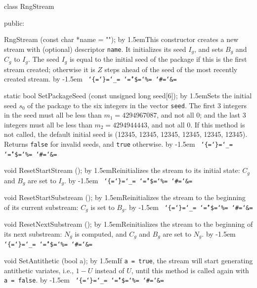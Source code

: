 \documentclass[12pt]{article}
\newif\iflong\longfalse
\def\setverbatim{\def\par{\leavevmode\endgraf}
            \parskip=0pt\parindent=0pt\obeylines\obeyspaces }
\def\ttverbatim{\setverbatim\tt
       \catcode`\{=\other \catcode`\}=\other \catcode`\_=\other
       \catcode`\^=\other \catcode`\$=\other \catcode`\%=\other
       \catcode`\#=\other \catcode`\&=\other \baselineskip=11pt
       }  %
\def\code {\vfil\vfilneg\vbox\bgroup\ttverbatim}
\let\endcode=\egroup
\def\parup{\nobreak\vskip -2pt\nobreak}
\def\tab{\small\parindent=0pt\advance\leftskip by 1.5em\parup}
\def\endtab{\vskip 0.01pt\advance\leftskip by -1.5em\normalsize}
\begin{document}
class RngStream
{
public:

RngStream (const char *name = "");
\endcode
 \tab This constructor  %
 creates a new stream with (optional) descriptor {\tt name}.
 It initializes its seed $I_g$, and sets $B_g$ and $C_g$ to $I_g$.
\iflong %
 It also sets its {\tt anti} and {\tt incPrec} switches to {\tt false}.
\fi %
  The seed $I_g$ is equal to the initial seed of the package
  if this is the first stream created;
   otherwise it is $Z$ steps ahead of the seed of the most recently
   created stream.
 \endtab
\code

static bool SetPackageSeed (const unsigned long seed[6]);
\endcode
 \tab Sets the initial seed $s_0$ of the package to the six integers
   in the vector {\tt seed}.
   The first 3 integers in the seed must all be
   less than $m_1 = 4294967087$, and not all 0;
   and the last 3 integers
   must all be less than $m_2 = 4294944443$, and not all 0.
   If this method is not called, the default initial seed
   is (12345, 12345, 12345, 12345, 12345, 12345).
   Returns {\tt false} for invalid seeds, and  {\tt true} otherwise.
 \endtab
\code

void ResetStartStream ();
\endcode
 \tab Reinitializes the stream to its initial state:
   $C_g$ and $B_g$ are set to $I_g$.
 \endtab
\code

void ResetStartSubstream ();
\endcode
 \tab Reinitializes the stream to the beginning of its current
   substream: $C_g$ is set to $B_g$.
 \endtab
\code

void ResetNextSubstream ();
\endcode
 \tab Reinitializes the stream to the beginning of its next
   substream: $N_g$ is computed, and
   $C_g$ and $B_g$ are set to $N_g$.
 \endtab
\code

void SetAntithetic (bool a);
\endcode
 \tab  If {\tt a = true}, the stream will start generating
 antithetic variates, i.e., $1-U$ instead of $U$, until this method is
 called again with {\tt a = false}.
 \endtab
\code

}
\end{document}
